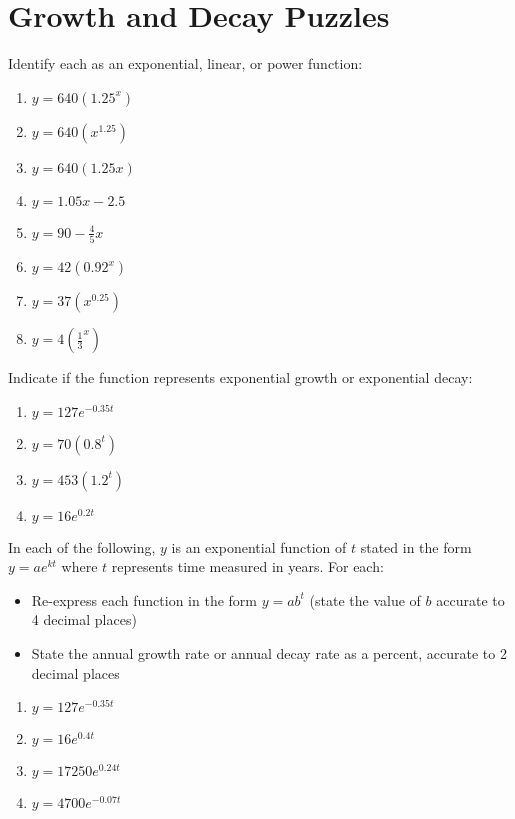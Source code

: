\section{Growth and Decay Puzzles}

\begin{puzzle}
    Identify each as an exponential, linear, or power function:
    \begin{enumerate}
        \item \( y = 640 (1.25^x) \)
        \item \( y = 640 (x^{1.25}) \)
        \item \( y = 640 (1.25x) \)
        \item \( y = 1.05x - 2.5 \)
        \item \( y = 90 - \frac{4}{5}x \)
        \item \( y = 42(0.92^x) \)
        \item \( y = 37(x^{0.25}) \)
        \item \( y = 4(\frac{1}{3}^x) \)
    \end{enumerate}
\end{puzzle}

\begin{puzzle}
    Indicate if the function represents exponential growth or exponential decay:
    \begin{enumerate}
        \item \( y = 127e^{-0.35t} \)
        \item \( y = 70 (0.8^t) \)
        \item \( y = 453(1.2^t) \)
        \item \( y = 16e^{0.2t} \)
    \end{enumerate}
\end{puzzle}

\begin{puzzle}
    In each of the following, \( y \) is an exponential function of \( t \) stated in the form \( y = ae^{kt} \) where \( t \) represents time measured in years. For each:
    \begin{itemize}
        \item Re-express each function in the form \( y = ab^t \) (state the value of \( b \) accurate to 4 decimal places)
        \item State the annual growth rate or annual decay rate as a percent, accurate to 2 decimal places
    \end{itemize}
    \begin{enumerate}
        \item \( y = 127e^{-0.35t} \)
        \item \( y = 16e^{0.4t} \)
        \item \( y = 17250 e^{0.24t} \)
        \item \( y = 4700 e^{-0.07t} \)
    \end{enumerate}
\end{puzzle}





